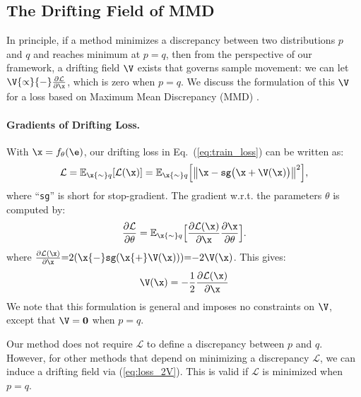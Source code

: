 \subsection{The Drifting Field of MMD}
\label{sec:theory_mmd_relation}

In principle, if a method minimizes a discrepancy between two distributions $p$ and $q$ and reaches minimum at $p=q$, then from the perspective of our framework, a drifting field $\V$ exists that governs sample movement: we can let $\V{\propto}{-}\frac{\partial\mathcal L }{\partial {\x}}$, which is zero when $p=q$.
We discuss the formulation of this $\V$ for a loss based on Maximum Mean Discrepancy (MMD) \cite{li2015generative,dziugaite2015training}.

\newcommand{\kkk}{\tilde{k}}
\paragraph{Gradients of Drifting Loss.}
With $\x=f_\theta(\e)$, our drifting loss in Eq.~(\ref{eq:train_loss}) can be written as:
\begin{equation}
\mathcal{L}
=
\mathbb{E}_{\x{\sim}q}
[
\mathcal{L}(\x)
]
=
\mathbb{E}_{\x{\sim}q}
\Big[
\big\|
\x
-
\text{\texttt{sg}}\big(
\x
+
\V(\x)
\big)
\big\|^2
\Big],
\end{equation}
where ``\texttt{sg}'' is short for stop-gradient. The gradient w.r.t. the parameters $\theta$ is computed by:
\begin{equation}
\frac{\partial\mathcal L }{\partial {\theta}} =
\mathbb{E}_{\x{\sim}q}\Big[
\frac{\partial\mathcal L(\x) }{\partial {\x}} \frac{\partial\x}{\partial\theta}
\Big].
\end{equation}
where
$
\frac{\partial\mathcal L(\x) }{\partial {\x}}{=}2
(
\x
{-}
\text{\texttt{sg}}(
\x
{+}
\V(\x)
)
)
{=}{-}2\V(\x)
$. This gives:
\begin{equation}
\label{eq:loss_2V}
\V(\x) = -\frac{1}{2}\frac{\partial\mathcal L(\x) }{\partial {\x}}
\end{equation}
We note that this formulation is general and imposes no constraints on $\V$, except that $\V=\textbf{0}$ when $p=q$.

Our method does not require $\mathcal{L}$ to define a discrepancy between $p$ and $q$. However, for other methods that depend on minimizing a discrepancy $\mathcal{L}$, we can induce a drifting field via (\ref{eq:loss_2V}). This is valid if $\mathcal{L}$ is minimized when $p=q$.

